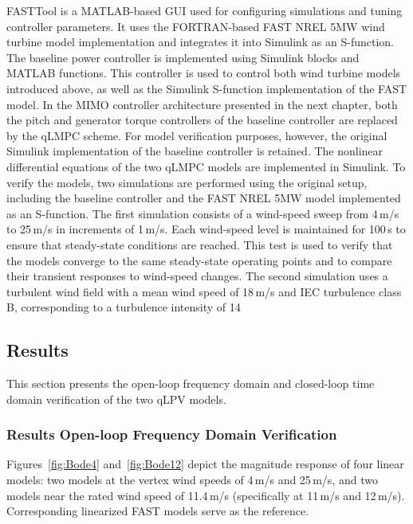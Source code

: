 {FASTTool is a MATLAB-based GUI used for configuring simulations and tuning controller parameters. It uses the FORTRAN-based FAST NREL 5MW wind turbine model implementation and integrates it into Simulink as an S-function. The baseline power controller is implemented using Simulink blocks and MATLAB functions. This controller is used to control both wind turbine models introduced above, as well as the Simulink S-function implementation of the FAST model. In the MIMO controller architecture presented in the next chapter, both the pitch and generator torque controllers of the baseline controller are replaced by the qLMPC scheme. For model verification purposes, however, the original Simulink implementation of the baseline controller is retained. The nonlinear differential equations of the two qLMPC models are implemented in Simulink. To verify the models, two simulations are performed using the original setup, including the baseline controller and the FAST NREL 5MW model implemented as an S-function. The first simulation consists of a wind-speed sweep from 4\,m/s to 25\,m/s in increments of 1\,m/s. Each wind-speed level is maintained for 100\,s to ensure that steady-state conditions are reached. This test is used to verify that the models converge to the same steady-state operating points and to compare their transient responses to wind-speed changes. The second simulation uses a turbulent wind field with a mean wind speed of 18\,m/s and IEC turbulence class B, corresponding to a turbulence intensity of 14%

\newpage
\subsection{Results}\label{subsec:ResultsqLPVModel}
This section presents the open-loop frequency domain and closed-loop time domain verification of the two qLPV models.
\subsubsection*{Results Open-loop Frequency Domain Verification}
Figures~\ref{fig:Bode4} and~\ref{fig:Bode12} depict the magnitude response of four linear models: two models at the vertex wind speeds of 4\,m/s and 25\,m/s, and two models near the rated wind speed of 11.4\,m/s (specifically at 11\,m/s and 12\,m/s). Corresponding linearized FAST models serve as the reference.
\begin{figure} [htp]\center
 

\end{figure}}
